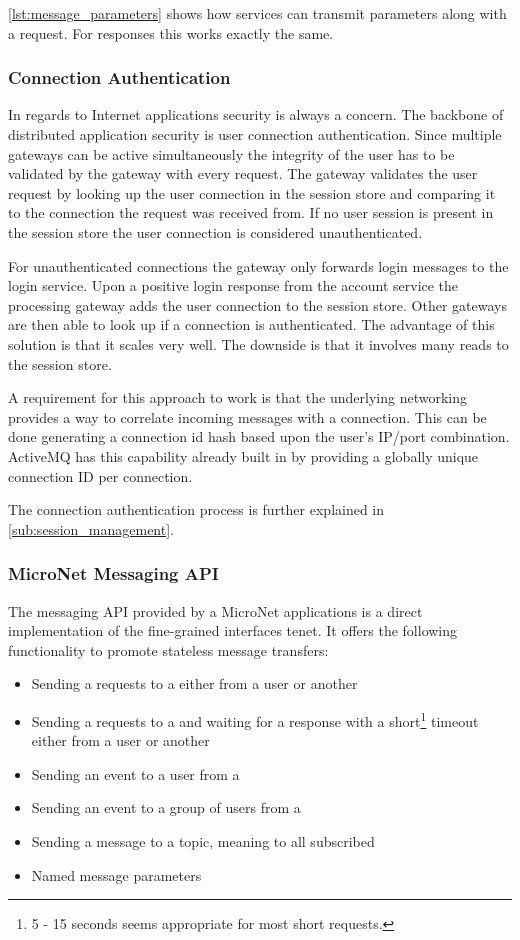 \autoref{lst:message_parameters} shows how services can transmit parameters
along with a request. For responses this works exactly the same.

\subsubsection{Connection Authentication}

In regards to Internet applications security is always a concern. The backbone
of distributed application security is user connection authentication.
Since multiple gateways can be active simultaneously the integrity of the user
has to be validated by the gateway with every request. The gateway validates the
user request by looking up the user connection in the session store and
comparing it to the connection the request was received from. If no user session
is present in the session store the user connection is considered
unauthenticated.

For unauthenticated connections the gateway only forwards login messages to the
login service. Upon a positive login response from the account service the
processing gateway adds the user connection to the session store. Other gateways
are then able to look up if a connection is authenticated. The advantage of this
solution is that it scales very well. The downside is that it involves many
reads to the session store.

A requirement for this approach to work is that the underlying networking
provides a way to correlate incoming messages with a connection. This can be
done generating a connection id hash based upon the user's IP/port combination.
ActiveMQ has this capability already built in by providing a globally unique
connection ID per connection.

The connection authentication process is further explained in
\autoref{sub:session_management}.

\subsubsection{MicroNet Messaging API}

The messaging API provided by a MicroNet applications is a direct implementation
of the fine-grained interfaces tenet. It offers the following functionality to
promote stateless message transfers:

\begin{itemize}
  \item Sending a requests to a \ms{} either from a user or another \ms{}
  \item Sending a requests to a \ms{} and waiting for a response with a
  short\footnote{5 - 15 seconds seems appropriate for most short requests.}
  timeout either from a user or another \ms{}
  \item Sending an event to a user from a \ms{}
  \item Sending an event to a group of users from a \ms{}
  \item Sending a message to a topic, meaning to all subscribed \mss{}
  \item Named message parameters
\end{itemize}

